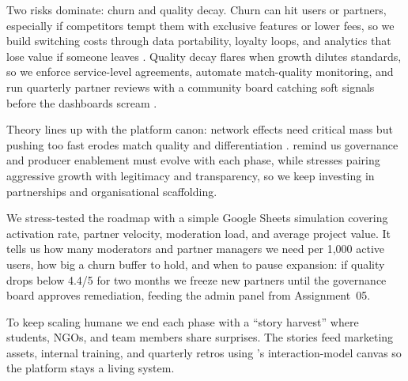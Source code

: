 Two risks dominate: churn and quality decay. Churn can hit users or partners, especially if competitors tempt them with exclusive features or lower fees, so we build switching costs through data portability, loyalty loops, and analytics that lose value if someone leaves \citep{FarrellSaloner1986,ShapiroVarian1999}. Quality decay flares when growth dilutes standards, so we enforce service-level agreements, automate match-quality monitoring, and run quarterly partner reviews with a community board catching soft signals before the dashboards scream \citep{Reillier2017}.

Theory lines up with the platform canon: network effects need critical mass but pushing too fast erodes match quality and differentiation \citep{Porter2008}. \citet{Choudary2016} remind us governance and producer enablement must evolve with each phase, while \citet{Srnicek2017} stresses pairing aggressive growth with legitimacy and transparency, so we keep investing in partnerships and organisational scaffolding.

We stress-tested the roadmap with a simple Google Sheets simulation covering activation rate, partner velocity, moderation load, and average project value. It tells us how many moderators and partner managers we need per 1,000 active users, how big a churn buffer to hold, and when to pause expansion: if quality drops below 4.4/5 for two months we freeze new partners until the governance board approves remediation, feeding the admin panel from Assignment~05.

To keep scaling humane we end each phase with a ``story harvest'' where students, NGOs, and team members share surprises. The stories feed marketing assets, internal training, and quarterly retros using \citet{Choudary2016}'s interaction-model canvas so the platform stays a living system.
